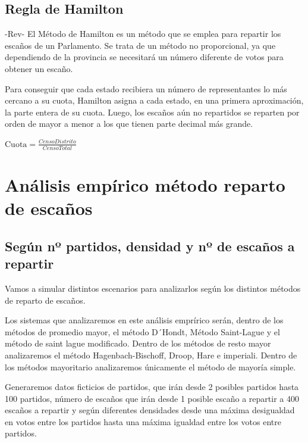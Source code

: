 \documentclass[12pt,a4paper,]{book}
\numberwithin{dummy}{section}
\theoremstyle{ocrenumbox}
\theoremstyle{blacknumex}
\theoremstyle{blacknumbox}
\theoremstyle{ocrenum}
\theoremstyle{ocrenum}
\begin{document}
\hypertarget{regla-de-hamilton}{%
\section{Regla de Hamilton}\label{regla-de-hamilton}}

-Rev- El Método de Hamilton es un método que se emplea para repartir los
escaños de un Parlamento. Se trata de un método no proporcional, ya que
dependiendo de la provincia se necesitará un número diferente de votos
para obtener un escaño.

Para conseguir que cada estado recibiera un número de representantes lo
más cercano a su cuota, Hamilton asigna a cada estado, en una primera
aproximación, la parte entera de su cuota. Luego, los escaños aún no
repartidos se reparten por orden de mayor a menor a los que tienen parte
decimal más grande.

\(\textrm{Cuota} = \frac{Censo Distrito}{Censo Total}\)

\hypertarget{anuxe1lisis-empuxedrico-muxe9todo-reparto-de-escauxf1os}{%
\chapter{Análisis empírico método reparto de
escaños}\label{anuxe1lisis-empuxedrico-muxe9todo-reparto-de-escauxf1os}}

\hypertarget{seguxfan-nuxba-partidos-densidad-y-nuxba-de-escauxf1os-a-repartir}{%
\section{Según nº partidos, densidad y nº de escaños a
repartir}\label{seguxfan-nuxba-partidos-densidad-y-nuxba-de-escauxf1os-a-repartir}}

Vamos a simular distintos escenarios para analizarlos según los
distintos métodos de reparto de escaños.

Los sistemas que analizaremos en este análisis emprírico serán, dentro
de los métodos de promedio mayor, el método D´Hondt, Método Saint-Lague
y el método de saint lague modificado. Dentro de los métodos de resto
mayor analizaremos el método Hagenbach-Bischoff, Droop, Hare e
imperiali. Dentro de los métodos mayoritario analizaremos únicamente el
método de mayoría simple.

Generaremos datos ficticios de partidos, que irán desde 2 posibles
partidos hasta 100 partidos, número de escaños que irán desde 1 posible
escaño a repartir a 400 escaños a repartir y según diferentes densidades
desde una máxima desigualdad en votos entre los partidos hasta una
máxima igualdad entre los votos entre partidos.
\end{document}
